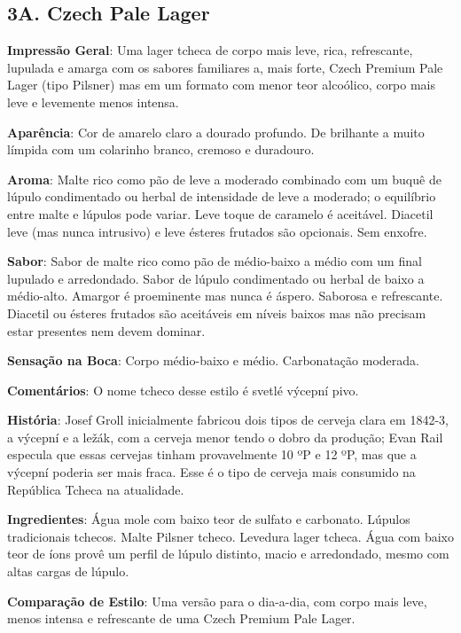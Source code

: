 \subsection*{3A. Czech Pale Lager}

\textbf{Impressão Geral}: Uma lager tcheca de corpo mais leve, rica, refrescante, lupulada e amarga com os sabores familiares a, mais forte, Czech Premium Pale Lager (tipo Pilsner) mas em um formato com menor teor alcoólico, corpo mais leve e levemente menos intensa.

\textbf{Aparência}: Cor de amarelo claro a dourado profundo. De brilhante a muito límpida com um colarinho branco, cremoso e duradouro.

\textbf{Aroma}: Malte rico como pão de leve a moderado combinado com um buquê de lúpulo condimentado ou herbal de intensidade de leve a moderado; o equilíbrio entre malte e lúpulos pode variar. Leve toque de caramelo é aceitável. Diacetil leve (mas nunca intrusivo) e leve ésteres frutados são opcionais. Sem enxofre.

\textbf{Sabor}: Sabor de malte rico como pão de médio-baixo a médio com um final lupulado e arredondado. Sabor de lúpulo condimentado ou herbal de baixo a médio-alto. Amargor é proeminente mas nunca é áspero. Saborosa e refrescante. Diacetil ou ésteres frutados são aceitáveis em níveis baixos mas não precisam estar presentes nem devem dominar.

\textbf{Sensação na Boca}: Corpo médio-baixo e médio. Carbonatação moderada.

\textbf{Comentários}: O nome tcheco desse estilo é svetlé výcepní pivo.

\textbf{História}: Josef Groll inicialmente fabricou dois tipos de cerveja clara em 1842-3, a výcepní e a ležák, com a cerveja menor tendo o dobro da produção; Evan Rail especula que essas cervejas tinham provavelmente 10 ºP e 12 ºP, mas que a výcepní poderia ser mais fraca. Esse é o tipo de cerveja mais consumido na República Tcheca na atualidade.

\textbf{Ingredientes}: Água mole com baixo teor de sulfato e carbonato. Lúpulos tradicionais tchecos. Malte Pilsner tcheco. Levedura lager tcheca. Água com baixo teor de íons provê um perfil de lúpulo distinto, macio e arredondado, mesmo com altas cargas de lúpulo.

\textbf{Comparação de Estilo}: Uma versão para o dia-a-dia, com corpo mais leve, menos intensa e refrescante de uma Czech Premium Pale Lager.

